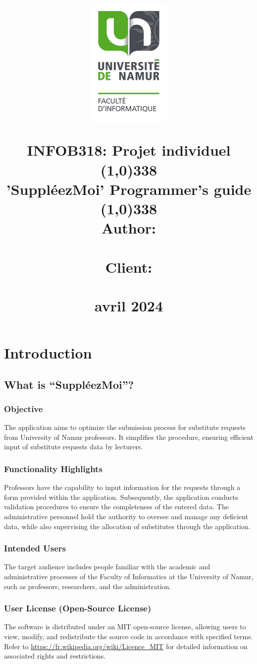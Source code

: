 \documentclass[12pt]{article}
\title{
    \vspace{-1in}
    \begin{center}
        \includegraphics[width=4cm]{logo.png} 
    \end{center}
  
    {\large INFOB318: Projet individuel}\\
    \bigskip
\line(1,0){338} \\ 
    \bigskip
    {\huge \textbf{'SuppléezMoi' Programmer’s guide}} \\
    \bigskip
    \line(1,0){338} \\ 
    \bigskip
    Author: \\
    \text{Ulrich Touji Nana}\\
    \bigskip
    Client: \\
    \text{Babette di Guardia}\\
    \bigskip
    \bigskip
    12 avril 2024
}
\date{}
\begin{document}
\maketitle
\thispagestyle{empty} 

\newpage
\setcounter{page}{1} 
\tableofcontents
\newpage


\section{Introduction}

\subsection{What is “SuppléezMoi”?}
\subsubsection{Objective}
The application aims to optimize the submission process for substitute requests from University of Namur professors. It simplifies the procedure, ensuring efficient input of substitute requests data by lecturers.

\subsubsection{Functionality Highlights}
Professors have the capability to input information for the requests through a form provided within the application. Subsequently, the application conducts validation procedures to ensure the completeness of the entered data. The administrative personnel hold the authority to oversee and manage any deficient data, while also supervising the allocation of substitutes through the application.

\subsubsection{Intended Users}
The target audience includes people familiar with the academic and administrative processes of the Faculty of Informatics at the University of Namur, such as professors, researchers, and the administration.

\subsubsection{User License (Open-Source License)}
The software is distributed under an MIT open-source license, allowing users to view, modify, and redistribute the source code in accordance with specified terms. Refer to \url{https://fr.wikipedia.org/wiki/Licence_MIT} for detailed information on associated rights and restrictions.
\end{document}

